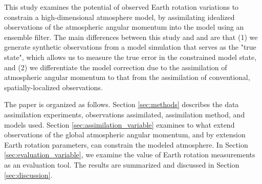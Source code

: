 This study examines the potential of observed Earth rotation variations to constrain a high-dimensional atmosphere model, by assimilating idealized observations of the atmospheric angular momentum into the model using an ensemble filter. 
The main differences between this study and \citet{Saynisch2010,Saynisch2011} and \citet{Saynisch2012} are that (1) we generate synthetic observations from a model simulation that serves as the "true state", which allows us to measure the true error in the constrained model state, and (2) we differentiate the model correction due to the assimilation of atmospheric angular momentum to that from the assimilation of conventional, spatially-localized observations. 


The paper is organized as follows.  
Section \ref{sec:methods} describes the data assimilation experiments, observations assimilated, assimilation method, and models used.
Section \ref{sec:assimilation_variable} examines to what extend observations of the global atmospheric angular momentum, and by extension Earth rotation parameters, can constrain the modeled atmosphere. 
In Section \ref{sec:evaluation_variable}, we examine the value of Earth rotation measurements as an evaluation tool.  
The results are summarized and discussed in Section \ref{sec:discussion}.

